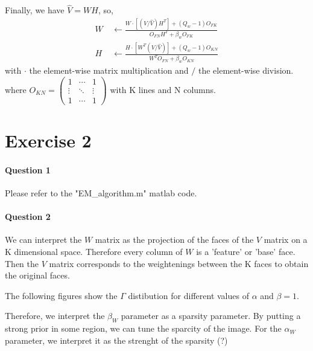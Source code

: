 \documentclass[a4paper,12pt]{article} %
\begin{document}
Finally, we have $\hat{V}=WH$, so,
\begin{align*}W\: &\leftarrow\frac{W\cdot[(V/\hat{V})H^T]+(Q_w-1)O_{FK}}{O_{FN}H^T+\beta_wO_{FK}}\\
H\: &\leftarrow\frac{H\cdot[W^T(V/\hat{V})]+(Q_w-1)O_{KN}}{W^TO_{FN}+\beta_wO_{KN}}
\end{align*}
with $\cdot$ the element-wise matrix multiplication and $/$ the element-wise division.  \\
where $O_{KN}=\left( 
\begin{array}{ccc} 
1&\cdots&1\\
\vdots&\ddots&\vdots\\
1& \cdots &1 
\end{array}
\right)$
with K lines and N columns.

\section{Exercise 2}
\paragraph{Question 1}
Please refer to the "EM\_algorithm.m" matlab code. \\

\paragraph{Question 2}

We can interpret the $W$ matrix as the projection of the faces of the $V$ matrix on a K dimensional space. Therefore every column of $W$ is a 'feature' or 'base' face. Then the $V$ matrix corresponds to the weightenings between the K faces to obtain the original faces.

The following figures show the $\Gamma$ distibution for different values of $\alpha$ and $\beta = 1$.

Therefore, we interpret the $\beta_W$ parameter as a sparsity parameter. By putting a strong prior in some region, we can tune the sparcity of the image. For the $\alpha_W$ parameter, we interpret it as the strenght of the sparsity (?)
\end{document}
